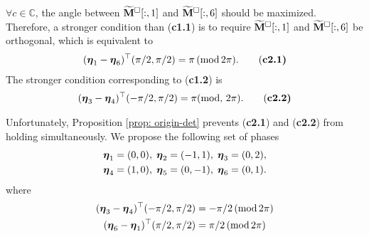 $\forall c\in \mathbb{C}$, the angle between $\widetilde{\mathbf{M}}^{\Box}[:,1]$ and $\widetilde{\mathbf{M}}^{\Box}[:,6]$ should be maximized.
Therefore, a stronger condition than ({\bf c1.1}) is to require $\widetilde{\mathbf{M}}^{\Box}[:,1]$ and $\widetilde{\mathbf{M}}^{\Box}[:,6]$ be orthogonal, which is equivalent to 
\begin{align*}
(\boldsymbol{\eta}_1-\boldsymbol{\eta}_6)^\top(\pi/2, \pi/2) = \pi \,(\text{mod}\, 2\pi).\tag{\bf c2.1}
\end{align*}
The stronger condition corresponding to ({\bf c1.2}) is 
\begin{align*}
(\boldsymbol{\eta}_3-\boldsymbol{\eta}_4)^\top(-\pi/2,\pi/2)=\pi(\text{mod},\,2\pi).\tag{\bf c2.2}
\end{align*} %


Unfortunately, Proposition \ref{prop: origin-det} prevents ({\bf c2.1}) and ({\bf c2.2}) from holding simultaneously.
We propose the following set of phases
\begin{align}\label{eq: phase-sol}
\boldsymbol{\eta}_1 = (0,0),\; \boldsymbol{\eta}_2 = (-1,1),\; \boldsymbol{\eta}_3 = (0,2),\notag\\
\boldsymbol{\eta}_4 = (1,0),\; \boldsymbol{\eta}_5 = (0,-1),\; \boldsymbol{\eta}_6 = (0,1).
\end{align}
where
\begin{align*}
(\boldsymbol{\eta}_3-\boldsymbol{\eta}_4)^\top(-\pi/2, \pi/2) &=-\pi/2\,(\text{mod}\,2\pi)\notag\\
 (\boldsymbol{\eta}_6 - \boldsymbol{\eta}_1)^\top(\pi/2,\pi/2) &= \pi/2\, (\text{mod}\,2\pi)\notag
\end{align*}

